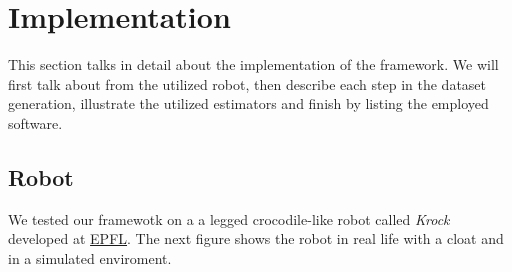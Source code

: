 \documentclass[../document.tex]{subfiles}
\begin{document}
\chapter{Implementation}
\label{chap: implementation}
This section talks in detail about the implementation of the framework. We will first talk about from the utilized robot, then describe each step in the dataset generation, illustrate the utilized estimators and finish by listing the employed software.
\section{Robot}
We tested our framewotk on a a legged crocodile-like robot called \emph{Krock} developed at \href{https://biorob.epfl.ch/}{EPFL}. The next figure shows the robot in real life with a cloat and in a simulated enviroment.
\end{document}
